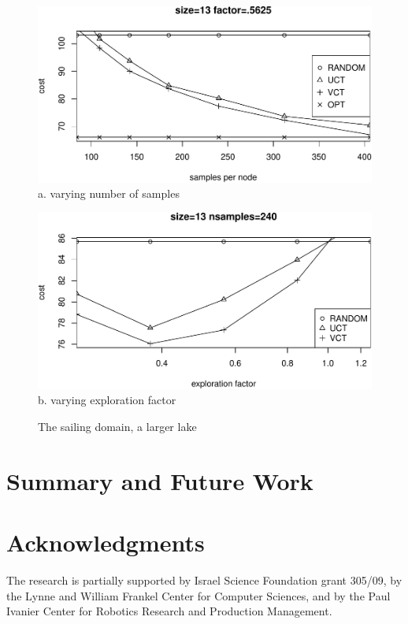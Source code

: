 \documentclass{article}
\begin{document}
\begin{figure}[t]
  \begin{minipage}[b]{0.5\linewidth} \centering
    \includegraphics[scale=0.45,trim=0pt 0pt 0pt
    0pt,clip]{sailing-size=13-factor=_5625.pdf}
    {a. varying number of samples}
  \end{minipage}
  \begin{minipage}[b]{0.5\linewidth} \centering
    \includegraphics[scale=0.45,trim=0pt 0pt 0pt
    0pt,clip]{sailing-size=13-nsamples=240.pdf}
    {b. varying exploration factor}
  \end{minipage}
  \caption{The sailing domain, a larger lake}
  \label{fig:sailing-13}
\end{figure}

\section{Summary and Future Work}

\section*{Acknowledgments}

The research is partially supported by Israel
Science Foundation grant 305/09, by the Lynne and William Frankel
Center for Computer Sciences, and by the Paul Ivanier Center for
Robotics Research and Production Management.
\end{document}
